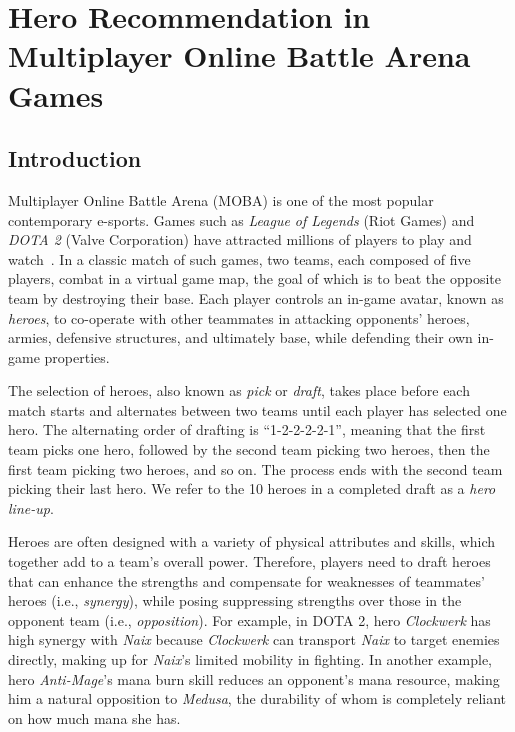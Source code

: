 \chapter{Hero Recommendation in Multiplayer Online Battle Arena Games} 

\label{chapter:draftart} 

\section{Introduction}

Multiplayer Online Battle Arena (MOBA) is one of the most popular contemporary e-sports. Games such as \textit{League of Legends} (Riot Games) and \textit{DOTA 2} (Valve Corporation) have attracted millions of players to play and watch~\cite{lol_fanbase,lol_27million}. In a classic match of such games, two teams, each composed of five players, combat in a virtual game map, the goal of which is to beat the opposite team by destroying their base. Each player controls an in-game avatar, known as \textit{heroes}, to co-operate with other teammates in attacking opponents' heroes, armies, defensive structures, and ultimately base, while defending their own in-game properties. 

The selection of heroes, also known as \textit{pick} or \textit{draft}, takes place before each match starts and alternates between two teams until each player has selected one hero. The alternating order of drafting is ``1-2-2-2-2-1'', meaning that the first team picks one hero, followed by the second team picking two heroes, then the first team picking two heroes, and so on. The process ends with the second team picking their last hero. We refer to the 10 heroes in a completed draft as a \textit{hero line-up}. 


Heroes are often designed with a variety of physical attributes and skills, which together add to a team's overall power. Therefore, players need to draft heroes that can enhance the strengths and compensate for weaknesses of teammates' heroes (i.e., \textit{synergy}), while posing suppressing strengths over those in the opponent team (i.e., \textit{opposition}). For example, in DOTA 2, hero \textit{Clockwerk} has high synergy with \textit{Naix} because \textit{Clockwerk} can transport \textit{Naix} to target enemies directly, making up for \textit{Naix}'s limited mobility in fighting. In another example, hero \textit{Anti-Mage}'s mana burn skill reduces an opponent's mana resource, making him a natural opposition to \textit{Medusa}, the durability of whom is completely reliant on how much mana she has.
 
